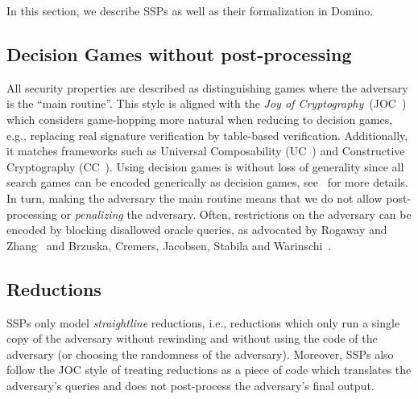 In this section, we describe SSPs as well as their formalization in Domino.

\subsection{Decision Games without post-processing} All security properties are described as distinguishing games where the adversary is the ``main routine''. This style is aligned with the \emph{Joy of Cryptography}~(JOC~\cite{JOC}) which considers game-hopping more natural when reducing to decision games, e.g., replacing real signature verification by table-based verification. Additionally, it matches frameworks such as Universal Composability (UC~\cite{FOCS:Canetti01}) and Constructive Cryptography (CC~\cite{FC:Maurer10}). Using decision games is without loss of generality since all search games can be encoded generically as decision games, 
see~\cite[Appendix B]{cryptocompanion} for more details. In turn, making the adversary the main routine means that we do not allow post-processing or \emph{penalizing} the adversary. Often, restrictions on the adversary can be encoded by blocking disallowed oracle queries, as advocated by Rogaway and Zhang~\cite{C:RogZha18} and Brzuska, Cremers, Jacobsen, Stabila and Warinschi~\cite{BCJSW25}.

\subsection{Reductions} \label{para:reductions} SSPs only model \emph{straightline} reductions, i.e., reductions which only run a single copy of the adversary without rewinding and without using the code of the adversary (or choosing the randomness of the adversary). Moreover, SSPs also follow the JOC style of treating reductions as a piece of code which translates the adversary's queries and does not post-process the adversary's final output. 

